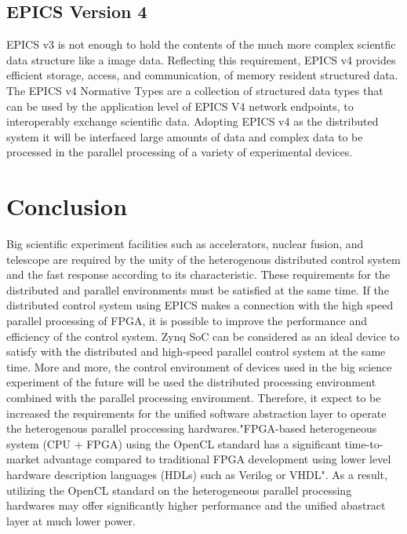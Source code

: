 \documentclass[journal]{IEEEtran}
\begin{document}
\subsection{EPICS Version 4}
EPICS v3 is not enough to hold the contents of the much more complex scientfic data structure like a image data.
Reflecting this requirement, EPICS v4\cite{epics_v4} provides efficient storage, access, and communication, of memory resident structured data. The EPICS v4 Normative Types\cite{epics_v4_normative} are a collection of structured data types that can be used by the application level of EPICS V4 network endpoints, to interoperably exchange scientific data. Adopting EPICS v4 as the distributed system it will be interfaced large amounts of data and complex data to be processed in the parallel processing of a variety of experimental devices.

\section{Conclusion}
Big scientific experiment facilities such as accelerators, nuclear fusion, and telescope are  required by the unity of the heterogenous distributed control system and the fast response  according to its characteristic. These requirements for the distributed and parallel environments must be satisfied at the same time. If the distributed control system using EPICS makes a connection with the high speed parallel processing of FPGA, it is possible to improve the performance and efficiency of the control system. Zynq SoC can be considered as an ideal device to satisfy with the distributed and high-speed parallel control system at the same time. More and more, the control environment of devices used in the big science experiment of the future will be used the distributed processing environment combined with the parallel processing environment. Therefore, it expect to be increased the requirements for the unified software abstraction layer to operate the heterogenous parallel proccessing hardwares."FPGA-based heterogeneous system (CPU + FPGA) using the OpenCL standard has a significant time-to-market advantage compared to traditional FPGA development using lower level hardware description languages (HDLs) such as Verilog or VHDL"\cite{opencl_on_altera}.  As a result, utilizing the OpenCL standard on the heterogeneous parallel processing hardwares may offer significantly higher performance and the unified abastract layer at much lower power. 

\end{document}
